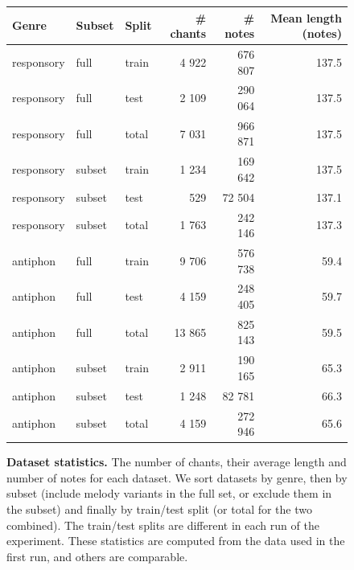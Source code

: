 \documentclass{article}
\begin{document}
\begin{figure}
\centering
\begin{tabular}{@{}lllrrr@{}}
\toprule
Genre      & Subset & Split & \# chants & \# notes & Mean length (notes) \\ \midrule
responsory & full   & train & 4 922  & 676 807     & 137.5  \\
responsory & full   & test  & 2 109  & 290 064     & 137.5  \\
responsory & full   & total & 7 031  & 966 871     & 137.5  \\
responsory & subset & train & 1 234  & 169 642     & 137.5  \\
responsory & subset & test  & 529   & 72 504      & 137.1  \\
responsory & subset & total & 1 763  & 242 146     & 137.3  \\
antiphon   & full   & train & 9 706  & 576 738     & 59.4   \\
antiphon   & full   & test  & 4 159  & 248 405     & 59.7   \\
antiphon   & full   & total & 13 865 & 825 143     & 59.5   \\
antiphon   & subset & train & 2 911  & 190 165     & 65.3   \\
antiphon   & subset & test  & 1 248  & 82 781      & 66.3   \\
antiphon   & subset & total & 4 159  & 272 946     & 65.6    
\\ \bottomrule
\end{tabular}
\caption{\textbf{Dataset statistics.} The number of chants, their average length and number of notes for each dataset. We sort datasets by genre, then by subset (include melody variants in the full set, or exclude them in the subset) and finally by train/test split (or total for the two combined).
The train/test splits are different in each run of the experiment. These statistics are computed from the data used in the first run, and others are comparable.
}
\label{suppl:dataset-statistics}
\end{figure}
\end{document}
